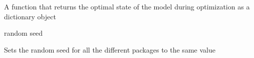 \documentclass[letterpaper,10pt,english]{sphinxmanual}
\begin{document}
\begin{fulllineitems}
\begin{fulllineitems}
\end{fulllineitems}


\begin{fulllineitems}
\label{\detokenize{modules/gqcml.utils:gqcml.utils.train.model_logger.summary}}
A function that returns the optimal state of the model during optimization as a dictionary object

\end{fulllineitems}


\end{fulllineitems}


\begin{fulllineitems}
\label{\detokenize{modules/gqcml.utils:gqcml.utils.train.random_seed}}
random seed

Sets the random seed for all the different packages to the same value

\end{fulllineitems}

\end{document}
